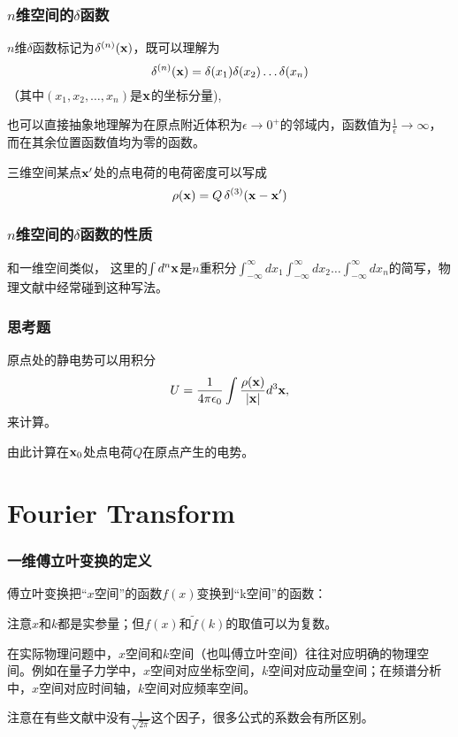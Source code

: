 \documentclass[CJK,13pt]{beamer}
\begin{document}
\begin{frame}
  \frametitle{$n$维空间的$\delta$函数}
  
  $n$维$\delta$函数标记为{\blue $\delta^{(n)}({\mathbf{x}})$}，既可以理解为
      {\blue
        $$\delta^{(n)}({\mathbf{x}}) = \delta(x_1)\delta(x_2)\ldots\delta(x_n) $$
      }
      （其中$(x_1,x_2,\ldots, x_n)$是${\mathbf{x}}$的坐标分量),
        
      也可以直接抽象地理解为{\blue 在原点附近体积为$\epsilon \rightarrow 0^+$的邻域内，函数值为$\frac{1}{\epsilon}\rightarrow \infty $，而在其余位置函数值均为零的函数。}

      \skiplines
      
\bex
三维空间某点${\mathbf{x}}'$处的点电荷的电荷密度可以写成
$$\rho({\mathbf{x}}) = Q\, \delta^{(3)}({\mathbf{x}} - {\mathbf{x}}')$$
\eex

\end{frame}

\begin{frame}
  \frametitle{$n$维空间的$\delta$函数的性质}
  
  和一维空间类似，
  这里的$\int d^n{\mathbf{x}}$是$n$重积分$\int_{-\infty}^\infty dx_1\int_{-\infty}^\infty dx_2\ldots\int_{-\infty}^\infty dx_n$的简写，物理文献中经常碰到这种写法。
\end{frame}


\begin{frame}
  \frametitle{思考题}
  原点处的静电势可以用积分
  $$U = \frac{1}{4\pi\epsilon_0} \int \frac{\rho({\mathbf{x}})}{|{\mathbf{x}}|} d^3{\mathbf{x}}, $$
  来计算。

  \skipline
  
  由此计算在${\mathbf{x}}_0$处点电荷$Q$在原点产生的电势。
\end{frame}



\section{Fourier Transform}



\begin{frame}
  \frametitle{一维傅立叶变换的定义}
傅立叶变换把``$x$空间''的函数$f(x)$变换到``k空间''的函数：

  \bitem
  \item{注意$x$和$k$都是实参量；但$f(x)$和$\widetilde{f}(k)$的取值可以为复数。}
\item{在实际物理问题中，$x$空间和$k$空间（也叫傅立叶空间）往往对应明确的物理空间。例如在量子力学中，$x$空间对应坐标空间，$k$空间对应动量空间；在频谱分析中，$x$空间对应时间轴，$k$空间对应频率空间。}
\item{注意在有些文献中没有$\frac{1}{\sqrt{2\pi}}$这个因子，很多公式的系数会有所区别。}
  \eitem
\end{frame}
\end{document}
